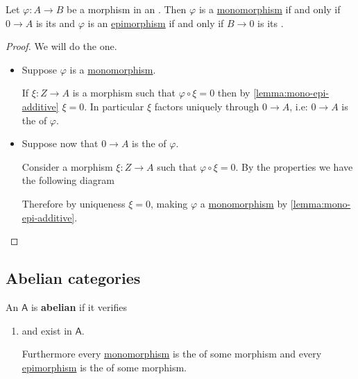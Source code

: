 \documentclass[../main.tex]{subfiles}
\begin{document}
\begin{lemma} \label{lemma:partial-sequence-additive}
  Let \(\varphi: A \to B\) be a morphism in an . Then \(\varphi\) is a \hyperref[def:mono-epi-morphism]{monomorphism} if and only if \(0 \to A\) is its  and \(\varphi\) is an \hyperref[def:mono-epi-morphism]{epimorphism} if and only if \(B \to 0\) is its .
\end{lemma}
\begin{proof}
  We will do the  one.
  \begin{itemize}
    \item[\(\implies\)] Suppose \(\varphi\) is a \hyperref[def:mono-epi-morphism]{monomorphism}.

          If \(\xi: Z \to A\) is a morphism such that \(\varphi \circ \xi = 0\) then by \autoref{lemma:mono-epi-additive} \(\xi = 0\).
          In particular \(\xi\) factors uniquely through \(0 \to A\), i.e: \(0 \to A\) is the  of \(\varphi\).
    \item[\(\impliedby\)] Suppose now that \(0 \to A\) is the  of \(\varphi\).

          Consider a morphism \(\xi: Z \to A\) such that \(\varphi \circ \xi = 0\).
          By the  properties we have the following diagram
          \begin{center}
          \end{center}
          Therefore by uniqueness \(\xi = 0\), making \(\varphi\) a \hyperref[def:mono-epi-morphism]{monomorphism} by \autoref{lemma:mono-epi-additive}.
  \end{itemize}
\end{proof}


\subsection{Abelian categories}
\begin{definition} \label{def:abelian-category}
  An  \(\mathsf{A}\) is \textbf{abelian} if it verifies
  \begin{enumerate}
    \item[A.4)]\label{axiom:abelian-kernel}  and  exist in \(\mathsf{A}\).

          Furthermore every \hyperref[def:mono-epi-morphism]{monomorphism} is the  of some morphism and every \hyperref[def:mono-epi-morphism]{epimorphism} is the  of some morphism.
  \end{enumerate}
\end{definition}
\end{document}
